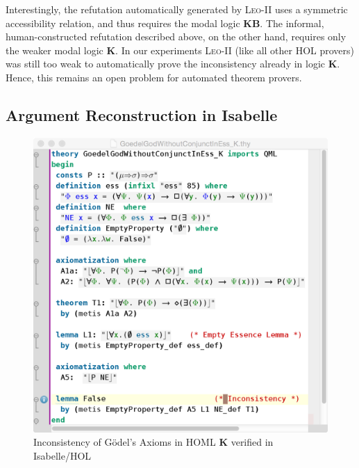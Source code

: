 \documentclass{llncs}
\newcommand{\logic}[1]{\textbf{#1}\xspace}
\newcommand{\KB}{\logic{KB}}
\newcommand{\K}{\logic{K}}
\begin{document}
Interestingly, the refutation automatically generated by
\textsc{Leo-II} uses a symmetric accessibility relation, and thus
requires the modal logic \KB. The informal, human-constructed
refutation described above, on the other hand, requires only the
weaker modal logic \K. In our experiments \textsc{Leo-II} (like all
other HOL provers) was still too weak to automatically prove the
inconsistency already in logic \K. Hence, this remains an open problem for automated
theorem provers.


\subsection{Argument Reconstruction in Isabelle}  \label{sec:arg2}
\begin{figure}[t]
\centerline{\includegraphics[width=1\columnwidth]{./InconsistencyIsabelleK.png}}
\caption{Inconsistency of G\"odel's Axioms in HOML \K verified in Isabelle/HOL} \label{InconsistencyIsabelleK}
\end{figure}
\end{document}
